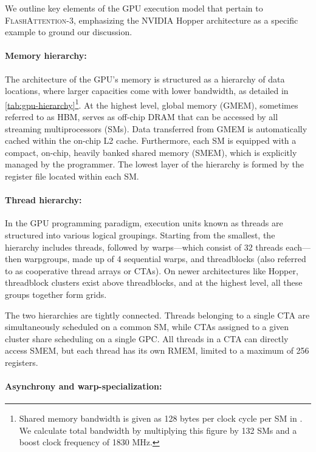 We outline key elements of the GPU execution model that pertain to \textsc{FlashAttention-3}, emphasizing the NVIDIA Hopper architecture as a specific example to ground our discussion.

\paragraph{Memory hierarchy:} The architecture of the GPU’s memory is structured as a hierarchy of data locations, where larger capacities come with lower bandwidth, as detailed in \cref{tab:gpu-hierarchy}\footnote{Shared memory bandwidth is given as 128 bytes per clock cycle per SM in \citet{luo2024benchmarking}. We calculate total bandwidth by multiplying this figure by 132 SMs and a boost clock frequency of 1830 MHz.}. At the highest level, global memory (GMEM), sometimes referred to as HBM, serves as off-chip DRAM that can be accessed by all streaming multiprocessors (SMs). Data transferred from GMEM is automatically cached within the on-chip L2 cache. Furthermore, each SM is equipped with a compact, on-chip, heavily banked shared memory (SMEM), which is explicitly managed by the programmer. The lowest layer of the hierarchy is formed by the register file located within each SM.

\paragraph{Thread hierarchy:} In the GPU programming paradigm, execution units known as threads are structured into various logical groupings. Starting from the smallest, the hierarchy includes threads, followed by warps—which consist of 32 threads each—then warpgroups, made up of 4 sequential warps, and threadblocks (also referred to as cooperative thread arrays or CTAs). On newer architectures like Hopper, threadblock clusters exist above threadblocks, and at the highest level, all these groups together form grids.

The two hierarchies are tightly connected. Threads belonging to a single CTA are simultaneously scheduled on a common SM, while CTAs assigned to a given cluster share scheduling on a single GPC. All threads in a CTA can directly access SMEM, but each thread has its own RMEM, limited to a maximum of 256 registers.

\paragraph{Asynchrony and warp-specialization:}

